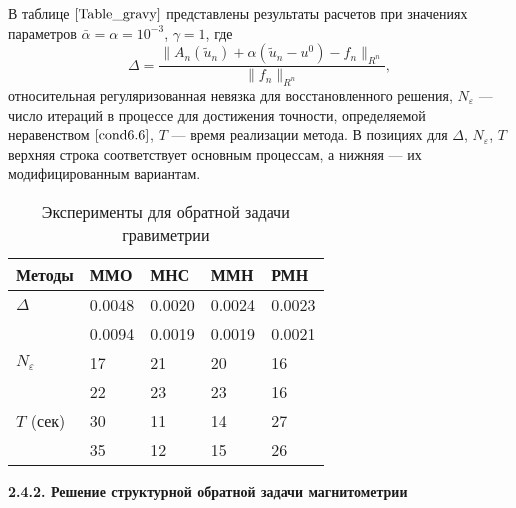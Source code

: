 В таблице $\ref{Table_gravy}$ представлены результаты расчетов при значениях параметров $\bar\alpha=\alpha=10^{-3}$, $\gamma=1$, где
\begin{equation}\label{form6.7}
\Delta=\frac{\|A_n(\tilde{u}_n)+\alpha(\tilde{u}_n-u^0)-f_n\|_{R^n}}{\|f_n\|_{R^n}},
\end{equation}
относительная регуляризованная невязка для восстановленного решения, $N_\varepsilon$ --- число итераций в процессе для достижения точности, определяемой неравенством $\eqref{cond6.6}$, $T$ --- время реализации метода. В позициях для $\Delta$, $N_\varepsilon$, $T$ верхняя строка соответствует основным процессам, а нижняя --- их модифицированным вариантам.
\begin{table}[H]
	\centering
	\renewcommand{\arraystretch}{1.5}
	\caption{Эксперименты для обратной задачи гравиметрии}
	\label{Table_gravy}
	\begin{tabular}{|p{}|p{}|p{}|p{}|p{}|}
		\hline
		\rule{0cm}{0.5cm}
		\textbf{Методы} & \textbf{ММО} & \textbf{МНС} & \textbf{ММН} & \textbf{РМН} \\ \hline
		\rule{0cm}{0.5cm}
		{$\Delta$} & 0.0048 & 0.0020 & 0.0024 & 0.0023	 \\ \cline{2-5} 
		\rule{0cm}{0.5cm}
		&  0.0094   & 0.0019    &  0.0019   &  0.0021   \\ \hline
		\rule{0cm}{0.5cm}
		{$N_\varepsilon$} & 17  &  21   &   20  &  16    \\ \cline{2-5}
		\rule{0cm}{0.5cm}
		&  22   &   23  &  23   &  16   \\ \hline
		\rule{0cm}{0.5cm}
		{$T$ (сек)}    &  30   &  11   &  14  & 27    \\ \cline{2-5}
		\rule{0cm}{0.5cm}
		& 35   & 12    &  15   &   26  \\ \hline
	\end{tabular}
\end{table}

{\bfseries 2.4.2. Решение структурной обратной задачи магнитометрии}
 
